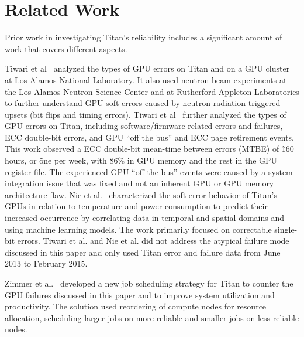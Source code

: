 \section{Related Work}
\label{section:related}

Prior work in investigating Titan's reliability includes a significant amount of work that covers different aspects.

Tiwari et al~\cite{Tiwari15Experience,7056044} analyzed the types of GPU errors on Titan and on a GPU cluster at Los Alamos National Laboratory. It also used neutron beam experiments at the Los Alamos Neutron Science Center and at Rutherford Appleton Laboratories to further understand GPU soft errors caused by neutron radiation triggered upsets (bit flips and timing errors).
%
Tiwari et al~\cite{10.1145/2807591.2807666} further analyzed the types of GPU errors on Titan, including software/firmware related errors and failures, ECC double-bit errors, and GPU ``off the bus'' and ECC page retirement events. This work observed a ECC double-bit mean-time between errors (MTBE) of \~160 hours, or \~ one per week, with 86\% in GPU memory and the rest in the GPU register file. The experienced GPU ``off the bus'' events were caused by a system integration issue that was fixed and not an inherent GPU or GPU memory architecture flaw.
%
Nie et al.~\cite{7446091,nie17characterizing,nie18machine} characterized the soft error behavior of Titan's GPUs in relation to temperature and power consumption to predict their increased occurrence by correlating data in temporal and spatial domains and using machine learning models. The work primarily focused on correctable single-bit errors.
%
Tiwari et al. and Nie et al. did not address the atypical failure mode discussed in this paper and only used Titan error and failure data from June 2013 to February 2015.

Zimmer et al.~\cite{8665764} developed a new job scheduling strategy for Titan to counter the GPU failures discussed in this paper and to improve system utilization and productivity. The solution used reordering of compute nodes for resource allocation, scheduling larger jobs on more reliable and smaller jobs on less reliable nodes.

